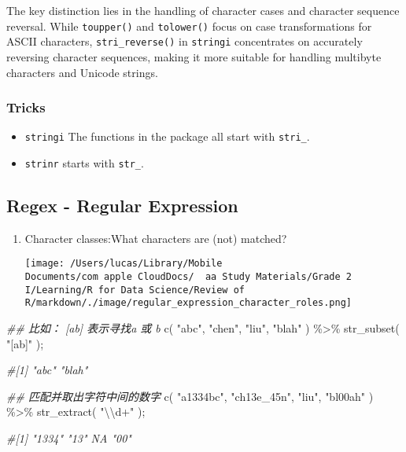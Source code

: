 \documentclass[
]{article}
\let\oldincludegraphics\includegraphics
\renewcommand{\includegraphics}[2][]{\begin{center}\oldincludegraphics[#1]{#2}\end{center}}
\newenvironment{Shaded}{}{}
\newcommand{\CommentTok}[1]{\textcolor[rgb]{0.38,0.63,0.69}{\textit{#1}}}
\newcommand{\DocumentationTok}[1]{\textcolor[rgb]{0.73,0.13,0.13}{\textit{#1}}}
\newcommand{\FunctionTok}[1]{\textcolor[rgb]{0.02,0.16,0.49}{#1}}
\newcommand{\NormalTok}[1]{#1}
\newcommand{\SpecialCharTok}[1]{\textcolor[rgb]{0.25,0.44,0.63}{#1}}
\newcommand{\StringTok}[1]{\textcolor[rgb]{0.25,0.44,0.63}{#1}}
\begin{document}
The key distinction lies in the handling of character cases and
character sequence reversal. While \texttt{toupper()} and
\texttt{tolower()} focus on case transformations for ASCII characters,
\texttt{stri\_reverse()} in \texttt{stringi} concentrates on accurately
reversing character sequences, making it more suitable for handling
multibyte characters and Unicode strings.

\hypertarget{tricks}{%
\subsubsection{Tricks}\label{tricks}}

\begin{itemize}
\item
  \texttt{stringi} The functions in the package all start with
  \texttt{stri\_}.
\item
  \texttt{strinr} starts with \texttt{str\_}.
\end{itemize}

\hypertarget{regex---regular-expression}{%
\subsection{Regex - Regular
Expression}\label{regex---regular-expression}}

\begin{enumerate}
\def\labelenumi{\arabic{enumi}.}
\item
  Character classes:What characters are (not) matched?

  \texttt{[image: /Users/lucas/Library/Mobile Documents/com~apple~CloudDocs/~~aa Study Materials/Grade 2 I/Learning/R for Data Science/Review of R/markdown/./image/regular\_expression\_character\_roles.png]}
\end{enumerate}

\begin{Shaded}
\begin{Highlighting}[]
\DocumentationTok{\#\# 比如： [ab] 表示寻找a 或 b }
\FunctionTok{c}\NormalTok{( }\StringTok{"abc"}\NormalTok{, }\StringTok{"chen"}\NormalTok{, }\StringTok{"liu"}\NormalTok{, }\StringTok{"blah"}\NormalTok{ ) }\SpecialCharTok{\%\textgreater{}\%} \FunctionTok{str\_subset}\NormalTok{( }\StringTok{"[ab]"}\NormalTok{ );}

\CommentTok{\#[1] "abc"  "blah"}

\DocumentationTok{\#\# 匹配并取出字符中间的数字 }
\FunctionTok{c}\NormalTok{( }\StringTok{"a1334bc"}\NormalTok{, }\StringTok{"ch13e\_45n"}\NormalTok{, }\StringTok{"liu"}\NormalTok{, }\StringTok{"bl00ah"}\NormalTok{ ) }\SpecialCharTok{\%\textgreater{}\%} \FunctionTok{str\_extract}\NormalTok{( }\StringTok{"}\SpecialCharTok{\textbackslash{}\textbackslash{}}\StringTok{d+"}\NormalTok{ );}

\CommentTok{\#[1] "1334" "13"   NA     "00" }
\end{Highlighting}
\end{Shaded}
\end{document}
